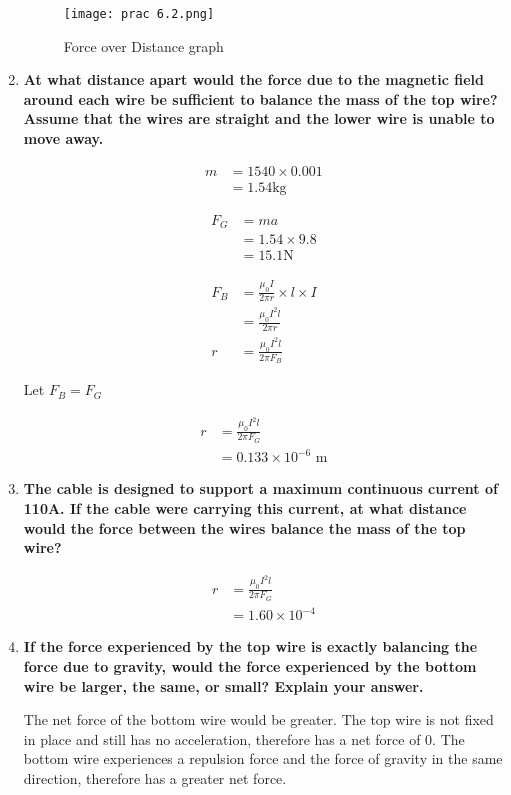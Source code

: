 \begin{enumerate}
			\begin{figure}
				\centering
				\texttt{[image: prac 6.2.png]}
				\caption{Force over Distance graph}
			\end{figure}

			\item \textbf{At what distance apart would the force due to the magnetic field around each wire be sufficient to balance the mass of the top wire? Assume that the wires are straight and the lower wire is unable to move away.}
			
				\begin{align*}
					m &= 1540 \times 0.001 \\
					  &= 1.54 \text{kg}
				\end{align*}

				\begin{align*}
					F_G &= ma \\
					    &= 1.54 \times 9.8 \\
					    &= 15.1 \text{N}
				\end{align*}
				
				\begin{align*}
					F_B &= \frac{\mu_0 I}{2 \pi r} \times l \times I \\
					    &= \frac{\mu_0 I^2 l}{2 \pi r} \\
					r &= \frac{\mu_0 I^2 l}{2 \pi F_B}
				\end{align*}

				\begin{center}
					Let $F_B = F_G$
				\end{center}
				
				\begin{align*}
					r &= \frac{\mu_0 I^2 l}{2 \pi F_G} \\
					  &= 0.133 \times 10^{-6} \text{ m}
				\end{align*}

			\item \textbf{The cable is designed to support a maximum continuous current of 110A. If the cable were carrying this current, at what distance would the force between the wires balance the mass of the top wire?}

				\begin{align*}
					r &= \frac{\mu_0 I^2 l}{2 \pi F_G} \\
					  &= 1.60 \times 10^{-4}
				\end{align*}

			\item \textbf{If the force experienced by the top wire is exactly balancing the force due to gravity, would the force experienced by the bottom wire be larger, the same, or small? Explain your answer.}

				The net force of the bottom wire would be greater. The top wire is not fixed in place and still has no acceleration, therefore has a net force of 0. The bottom wire experiences a repulsion force and the force of gravity in the same direction, therefore has a greater net force.
		\end{enumerate}


